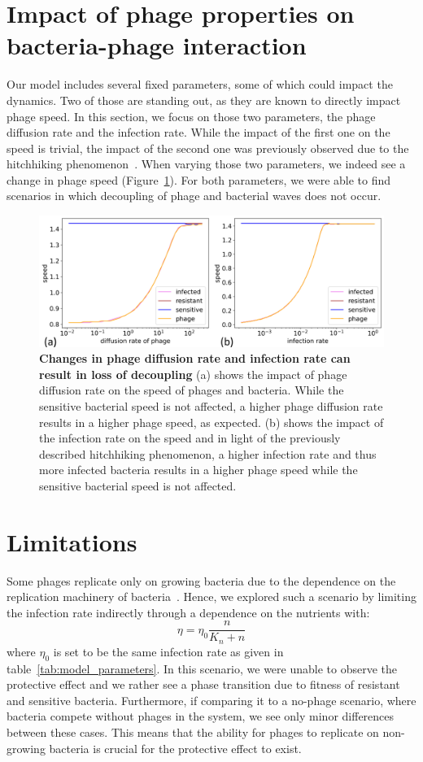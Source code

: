 \section{Impact of phage properties on bacteria-phage interaction}
Our model includes several fixed parameters, some of which could impact the dynamics. Two of those are standing out, as they are known to directly impact phage speed. In this section, we focus on those two parameters, the phage diffusion rate and the infection rate. While the impact of the first one on the speed is trivial, the impact of the second one was previously observed due to the hitchhiking phenomenon~\cite{Ping2020-vd}. When varying those two parameters, we indeed see a change in phage speed (Figure~\ref{fig:results_parameter_change}). For both parameters, we were able to find scenarios in which decoupling of phage and bacterial waves does not occur.
\begin{figure}
\centering
\includegraphics[width=\linewidth]{graphics/2025_09_30_phages_fig10.png}
\caption{\textbf{Changes in phage diffusion rate and infection rate can result in loss of decoupling} (a) shows the impact of phage diffusion rate on the speed of phages and bacteria. While the sensitive bacterial speed is not affected, a higher phage diffusion rate results in a higher phage speed, as expected. (b) shows the impact of the infection rate on the speed and in light of the previously described hitchhiking phenomenon, a higher infection rate and thus more infected bacteria results in a higher phage speed while the sensitive bacterial speed is not affected.}
\label{fig:results_parameter_change}
\end{figure}

\section{Limitations}
Some phages replicate only on growing bacteria due to the dependence on the replication machinery of bacteria~\cite{Los2007-px, Maffei2022-aj}. Hence, we explored such a scenario by limiting the infection rate indirectly through a dependence on the nutrients with:
\begin{equation}
    \eta = \eta_0 \frac{n}{K_n + n}
\end{equation}
where $\eta_0$ is set to be the same infection rate as given in table~\ref{tab:model_parameters}.
In this scenario, we were unable to observe the protective effect and we rather see a phase transition due to fitness of resistant and sensitive bacteria. Furthermore, if comparing it to a no-phage scenario, where bacteria compete without phages in the system, we see only minor differences between these cases.
This means that the ability for phages to replicate on non-growing bacteria is crucial for the protective effect to exist.